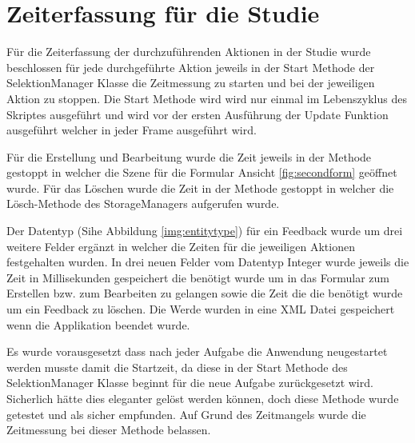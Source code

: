 \section{Zeiterfassung für die Studie}

Für die Zeiterfassung der durchzuführenden Aktionen in der Studie wurde beschlossen für jede durchgeführte Aktion
jeweils in der Start Methode der SelektionManager Klasse die Zeitmessung zu starten und bei der jeweiligen Aktion zu stoppen.
Die Start Methode wird wird nur einmal im Lebenszyklus des Skriptes ausgeführt und wird vor der ersten Ausführung der Update Funktion ausgeführt welcher in jeder Frame ausgeführt wird. \cite{Unity}

Für die Erstellung und Bearbeitung wurde die Zeit jeweils in der Methode gestoppt in welcher die Szene für die Formular Ansicht \ref{fig:secondform}
geöffnet wurde. Für das Löschen wurde die Zeit in der Methode gestoppt in welcher die Lösch-Methode des StorageManagers aufgerufen wurde. 

Der Datentyp (Sihe Abbildung \ref{img:entitytype}) für ein Feedback wurde um drei weitere Felder ergänzt in welcher die Zeiten für die jeweiligen Aktionen festgehalten wurden. In drei neuen Felder vom Datentyp Integer wurde jeweils die Zeit
in Millisekunden gespeichert die benötigt wurde um in das Formular zum Erstellen bzw. zum Bearbeiten zu gelangen sowie die Zeit die die benötigt wurde um ein Feedback zu löschen. 
Die Werde wurden in eine XML Datei gespeichert wenn die Applikation beendet wurde. 

Es wurde vorausgesetzt dass nach jeder Aufgabe die Anwendung neugestartet werden musste damit die Startzeit, da diese in der Start Methode des SelektionManager Klasse beginnt für die neue Aufgabe zurückgesetzt wird. 
Sicherlich hätte dies eleganter gelöst werden können, doch diese Methode wurde getestet und als sicher empfunden. Auf Grund des Zeitmangels wurde die Zeitmessung bei dieser Methode belassen.
